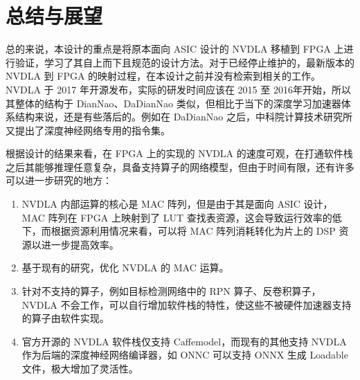 \chapter{总结与展望}\label{chap:conclusion}

总的来说，本设计的重点是将原本面向 ASIC 设计的 NVDLA 移植到 FPGA 上进行验证，学习了其自上而下且规范的设计方法。对于已经停止维护的，最新版本的 NVDLA 到 FPGA 的映射过程，在本设计之前并没有检索到相关的工作。NVDLA 于 2017 年开源发布，实际的研发时间应该在 2015 至 2016年开始，所以其整体的结构于 DianNao、DaDianNao 类似，但相比于当下的深度学习加速器体系结构来说，还是有些落后的。例如在 DaDianNao 之后，中科院计算技术研究所又提出了深度神经网络专用的指令集\cite{7551409}。

根据设计的结果来看，在 FPGA 上的实现的 NVDLA 的速度可观，在打通软件栈之后其能够推理任意复杂，具备支持算子的网络模型，但由于时间有限，还有许多可以进一步研究的地方：

\begin{enumerate}
    \item NVDLA 内部运算的核心是 MAC 阵列，但是由于其是面向 ASIC 设计，MAC 阵列在 FPGA 上映射到了 LUT 查找表资源，这会导致运行效率的低下，而根据资源利用情况来看，可以将 MAC 阵列消耗转化为片上的 DSP 资源以进一步提高效率。
    \item 基于现有的研究\cite{祁琛2018应用于神经网络的高效能计算单元的研究与实现}，优化 NVDLA 的 MAC 运算。
    \item 针对不支持的算子，例如目标检测网络中的 RPN 算子、反卷积算子，NVDLA 不会工作，可以自行增加软件栈的特性，使这些不被硬件加速器支持的算子由软件实现。
    \item 官方开源的 NVDLA 软件栈仅支持 Caffemodel，而现有的其他支持 NVDLA 作为后端的深度神经网络编译器，如 ONNC 可以支持 ONNX 生成 Loadable 文件，极大增加了灵活性。
\end{enumerate}
